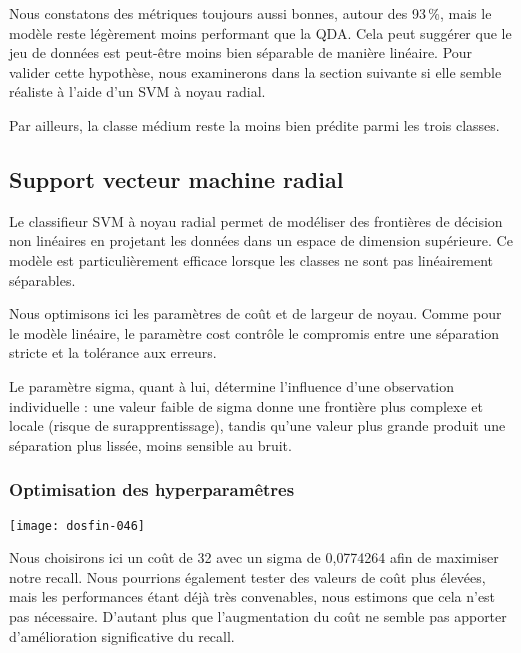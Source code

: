 \documentclass[a4paper,11pt]{article}
\begin{document}
Nous constatons des métriques toujours aussi bonnes, autour des 93\,\%, mais le modèle reste légèrement moins performant que la QDA. Cela peut suggérer que le jeu de données est peut-être moins bien séparable de manière linéaire. Pour valider cette hypothèse, nous examinerons dans la section suivante si elle semble réaliste à l’aide d’un SVM à noyau radial.

Par ailleurs, la classe médium reste la moins bien prédite parmi les trois classes.

\newpage

\subsection{Support vecteur machine radial}

Le classifieur SVM à noyau radial permet de modéliser des frontières de décision non linéaires en projetant les données dans un espace de dimension supérieure. Ce modèle est particulièrement efficace lorsque les classes ne sont pas linéairement séparables.

Nous optimisons ici les paramètres de coût et de largeur de noyau. Comme pour le modèle linéaire, le paramètre cost contrôle le compromis entre une séparation stricte et la tolérance aux erreurs.

Le paramètre sigma, quant à lui, détermine l’influence d’une observation individuelle : une valeur faible de sigma donne une frontière plus complexe et locale (risque de surapprentissage), tandis qu’une valeur plus grande produit une séparation plus lissée, moins sensible au bruit.



\subsubsection{Optimisation des hyperparamêtres}



\begin{center}

\texttt{[image: dosfin-046]}

\end{center}

Nous choisirons ici un coût de 32 avec un sigma de 0{,}0774264 afin de maximiser notre recall.  
Nous pourrions également tester des valeurs de coût plus élevées, mais les performances étant déjà très convenables, nous estimons que cela n’est pas nécessaire.  
D’autant plus que l’augmentation du coût ne semble pas apporter d’amélioration significative du recall.
\end{document}
